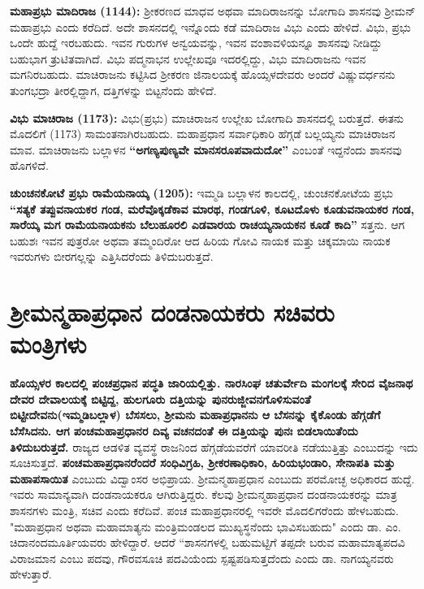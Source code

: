 \textbf{ಮಹಾಪ್ರಭು ಮಾದಿರಾಜ (1144):} ಶ‍್ರೀಕರಣದ ಮಾಧವ ಅಥವಾ ಮಾದಿರಾಜನನ್ನು ಬೋಗಾದಿ ಶಾಸನವು ಶ‍್ರೀಮನ್\-​ಮಹಾಪ್ರಭು ಎಂದು ಕರೆದಿದೆ. ಅದೇ ಶಾಸನದಲ್ಲಿ ಇನ್ನೊಂದು ಕಡೆ ಮಾದಿರಾಜ ವಿಭು ಎಂದು ಹೇಳಿದೆ. ವಿಭು, ಪ್ರಭು ಒಂದೇ ಹುದ್ದೆ ಇರಬಹುದು. ಇವನ ಗುರುಗಳ ಅನ್ವಯವನ್ನು, ಇವನ ವಂಶಾವಳಿಯನ್ನೂ ಶಾಸನವು ನೀಡಿದ್ದು ಬಹುಭಾಗ ತ್ರುಟಿತವಾಗಿದೆ. ವಿಭು ಪದ್ಮನಾಭನ ಉಲ್ಲೇಖವೂ ಇದರಲ್ಲಿದ್ದು, ವಿಭು ಮಾದಿರಾಜನು ಇವನ ಮಗನಿರಬಹುದು. ಮಾಚಿರಾಜನು ಕಟ್ಟಿಸಿದ ಶ‍್ರೀಕರಣ ಜಿನಾಲಯಕ್ಕೆ ಹೊಯ್ಸಳದೇವರು ಅಂದರೆ ವಿಷ್ಣುವರ್ಧನನು ತುಂಗಭದ್ರಾ ತೀರಲ್ಲಿದ್ದಾಗ, ದತ್ತಿಗಳನ್ನು ಬಿಟ್ಟನೆಂದು ಹೇಳಿದೆ.

\textbf{ವಿಭು ಮಾಚಿರಾಜ (1173):} ವಿಭು(ಪ್ರಭು) ಮಾಚಿರಾಜನ ಉಲ್ಲೇಖ ಬೋಗಾದಿ ಶಾಸನದಲ್ಲಿ ಬರುತ್ತದೆ. ಈತನು ಮೊದಲಿಗೆ (1173) ಸಾಮಂತನಾಗಿರಬಹುದು. ಮಹಾಪ್ರಧಾನ ಸರ್ವಾಧಿಕಾರಿ ಹೆಗ್ಗಡೆ ಬಲ್ಲಯ್ಯನು ಮಾಚಿರಾಜನ ಮಾವ. ಮಾಚಿರಾಜನು ಬಲ್ಲಾಳನ \textbf{“ಅಗಣ್ಯಪುಣ್ಯವೇ ಮಾನಸರೂಪವಾದುದೋ”} ಎಂಬಂತೆ ಇದ್ದನೆಂದು ಶಾಸನವು ಹೊಗಳಿದೆ.

\textbf{ಚುಂಚನಕೋಟೆ ಪ್ರಭು ರಾಮೆಯನಾಯ್ಕ (1205):} ಇಮ್ಮಡಿ ಬಲ್ಲಾಳನ ಕಾಲದಲ್ಲಿ, ಚುಂಚನಕೋಟೆಯ ಪ್ರಭು \textbf{“ಸತ್ಯಕೆ ತಪ್ಪುವನಾಯಕರ ಗಂಡ, ಮರೆವೊಕ್ಕಡೆಕಾವ ಮಾರಥ, ಗಂಡಗೂಳಿ, ಕೂಟದೊಳು ಕೂಡುವನಾಯಕರ ಗಂಡ, ಸಾರೆಯ್ಕ ಮಗ ರಾಮೆಯನಾಯಕನು ಬೆಲುಹೂರಲಿ ಎಡವಾರಯ ರಾಚಯ್ಯನಾಯಕನ ಕೂಡೆ ಕಾದಿ”} ಸತ್ತನು. ಆಗ ಬಹುಶಃ ಇವನ ಪುತ್ರರೋ ಅಥವಾ ತಮ್ಮಂದಿರೋ ಆದ ಹಿರಿಯ ಗೋವಿ ನಾಯಕ ಮತ್ತು ಚಿಕ್ಕಮಾಯಿ ನಾಯಕ ಇವರುಗಳು ಬೀರಗಲ್ಲನ್ನು ಎತ್ತಿಸಿದರೆಂದು ತಿಳಿದುಬರುತ್ತದೆ.

\newpage

\section{ಶ‍್ರೀಮನ್ಮಹಾಪ್ರಧಾನ ದಂಡನಾಯಕರು\enginline{-} ಸಚಿವರು\enginline{-} ಮಂತ್ರಿಗಳು}

\textbf{ಹೊಯ್ಸಳರ ಕಾಲದಲ್ಲಿ ಪಂಚಪ್ರಧಾನ ಪದ್ಧತಿ ಜಾರಿಯಲ್ಲಿತ್ತು. ನಾರಸಿಂಘ ಚತುರ್ವೇದಿ ಮಂಗಲಕ್ಕೆ ಸೇರಿದ ವೈಜನಾಥ ದೇವರ ದೇವಾಲಯಕ್ಕೆ ಬಿಟ್ಟಿದ್ದ, ಹುಲಗೂರು ದತ್ತಿಯನ್ನು ಪುನರುಜ್ಜೀವನಗೊಳಿಸುವಂತೆ ಬಿಟ್ಟೀದೇವನು(ಇಮ್ಮಡಿಬಲ್ಲಾಳ) ಬೆಸಸಲು, ಶ‍್ರೀಮನು ಮಹಾಪ್ರಧಾನನು ಆ ಬೆಸನನ್ನು ಕೈಕೊಂಡು ಹೆಗ್ಗಡೆಗೆ ಬೆಸೆಸಿದನು. ಆಗ ಪಂಚಮಹಾಪ್ರಧಾನರ ದಿವ್ಯ ವಚನದಂತೆ ಈ ದತ್ತಿಯನ್ನು ಪುನಃ ಬಿಡಲಾಯಿತೆಂದು ತಿಳಿದುಬರುತ್ತದೆ.} ರಾಜ್ಯದ ಆಡಳಿತ ವ್ಯವಸ್ಥೆ ರಾಜನಿಂದ ಹೆಗ್ಗಡೆಯವರೆಗೆ ಯಾವರೀತಿ ನಡೆಯುತ್ತಿತ್ತು ಎಂಬುದನ್ನು ಇದು ಸೂಚಿಸುತ್ತದೆ. \textbf{ಪಂಚಮಹಾಪ್ರಧಾನರೆಂದರೆ ಸಂಧಿವಿಗ್ರಹಿ, ಶ‍್ರೀಕರಣಾಧಿಕಾರಿ, ಹಿರಿಯಭಂಡಾರಿ, ಸೇನಾಪತಿ ಮತ್ತು ಮಹಾಪಸಾಯಿತ} ಎಂಬುದು ವಿದ್ವಾಂಸರ ಅಭಿಪ್ರಾಯ. ಶ‍್ರೀಮನ್ಮಹಾಪ್ರಧಾನ ಎಂಬುದು ಪರಮೋಚ್ಛ ಅಧಿಕಾರದ ಹುದ್ದೆ. ಇವರು ಸಾಮಾನ್ಯವಾಗಿ ದಂಡನಾಯಕರೂ ಆಗಿರುತ್ತಿದ್ದರು. ಕೆಲವು ಶ‍್ರೀಮನ್ಮಹಾಪ್ರಧಾನ ದಂಡನಾಯಕರನ್ನು ಮಾತ್ರ ಶಾಸನಗಳು ಮಂತ್ರಿ, ಸಚಿವ ಎಂದು ಕರೆದಿವೆ. ಪಂಚ ಮಹಾಪ್ರಧಾನ\-ರಲ್ಲಿ ಇವರೇ ಮೊದಲಿಗರೆಂದು ಹೇಳಬಹುದು. "ಮಹಾಪ್ರಧಾನ ಅಥವಾ ಮಹಾಮಾತ್ಯನು ಮಂತ್ರಿಮಂಡಲದ ಮುಖ್ಯಸ್ಥನೆಂದು ಭಾವಿಸಬಹುದು" ಎಂದು ಡಾ. ಎಂ. ಚಿದಾನಂದಮೂರ್ತಿಯವರು ಹೇಳಿದ್ದಾರೆ. ಆದರೆ “ಶಾಸನಗಳಲ್ಲಿ ಬಹುಮಟ್ಟಿಗೆ ತಪ್ಪದೇ ಬರುವ ಮಹಾಮಾತ್ಯಪದವಿ ವಿರಾಜಮಾನ ಎಂಬು ಪದವು, ಗೌರವಸೂಚಿ ಪದವಿಯೆಂದು ಸ್ಪಷ್ಟಪಡಿಸುತ್ತದೆಂದು ಎಂದು ಡಾ. ನಾಗಯ್ಯನವರು ಹೇಳುತ್ತಾರೆ.

